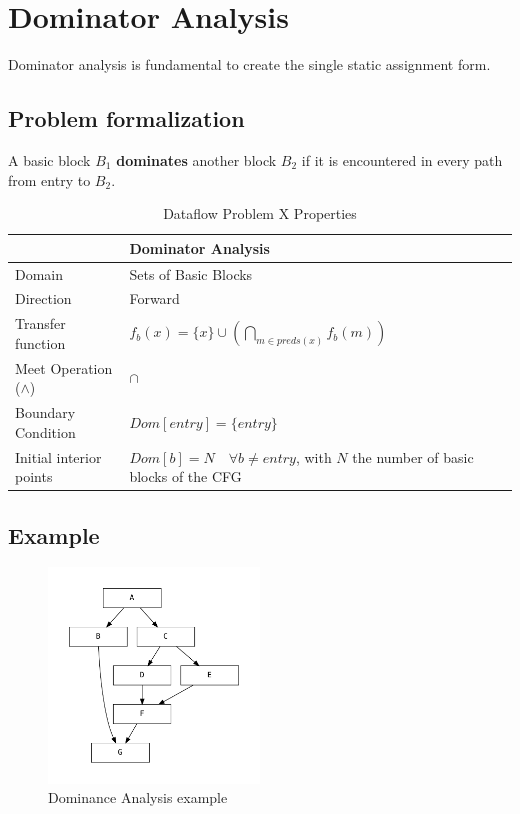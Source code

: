 \documentclass{article}
\begin{document}
\section{Dominator Analysis}

Dominator analysis is fundamental to create the single static assignment form.

\subsection{Problem formalization}

A basic block $B_1$ \textbf{dominates} another block $B_2$ if it is encountered in every path from entry to $B_2$.

\begin{table}[H]
\centering
\begin{tabular}{|p{}|p{}|}
\hline
 & \textbf{Dominator Analysis} \\
\hline
Domain & Sets of Basic Blocks \\
\hline
Direction & Forward \\
\hline
Transfer function & $f_b(x) = \{x\} \cup (\bigcap_{m \in preds(x)} f_b(m)) $ \\
\hline
Meet Operation ($\wedge$) & $\cap$ \\
\hline
Boundary Condition & $Dom[entry] = \{entry\}$ \\
\hline
Initial interior points & $Dom[b] = N \quad \forall b \neq entry$, with $N$ the number of basic blocks of the CFG \\
\hline
\end{tabular}
\caption{Dataflow Problem X Properties}
\label{tab:dataflow_problem_x}
\end{table}

\subsection{Example}

\begin{figure}[H]
    \centering
    \includegraphics[width=0.5\textwidth]{graphs/dominance.pdf}
    \caption{Dominance Analysis example}
    \label{fig:enter-label}
\end{figure}
\end{document}
